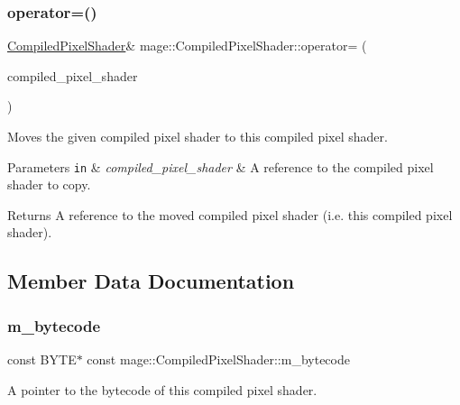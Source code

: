 \subsubsection{\texorpdfstring{operator=()}{operator=()}\hspace{0.1cm}{\footnotesize\ttfamily [2/2]}}
{\footnotesize\ttfamily \hyperlink{structmage_1_1_compiled_pixel_shader}{Compiled\+Pixel\+Shader}\& mage\+::\+Compiled\+Pixel\+Shader\+::operator= (\begin{DoxyParamCaption}\item[{\hyperlink{structmage_1_1_compiled_pixel_shader}{Compiled\+Pixel\+Shader} \&\&}]{compiled\+\_\+pixel\+\_\+shader }\end{DoxyParamCaption})\hspace{0.3cm}{\ttfamily [delete]}}

Moves the given compiled pixel shader to this compiled pixel shader.


\begin{DoxyParams}[1]{Parameters}
\mbox{\tt in}  & {\em compiled\+\_\+pixel\+\_\+shader} & A reference to the compiled pixel shader to copy. \\
\hline
\end{DoxyParams}
\begin{DoxyReturn}{Returns}
A reference to the moved compiled pixel shader (i.\+e. this compiled pixel shader). 
\end{DoxyReturn}


\subsection{Member Data Documentation}
\hypertarget{structmage_1_1_compiled_pixel_shader_a75f72532dcde21b055bc24989fdb6c51}{}\label{structmage_1_1_compiled_pixel_shader_a75f72532dcde21b055bc24989fdb6c51} 
\subsubsection{\texorpdfstring{m\+\_\+bytecode}{m\_bytecode}}
{\footnotesize\ttfamily const B\+Y\+TE$\ast$ const mage\+::\+Compiled\+Pixel\+Shader\+::m\+\_\+bytecode}

A pointer to the bytecode of this compiled pixel shader. \hypertarget{structmage_1_1_compiled_pixel_shader_ab35073e4116ee4ccb8dd07d1e7d0c14a}{}\label{structmage_1_1_compiled_pixel_shader_ab35073e4116ee4ccb8dd07d1e7d0c14a} 
